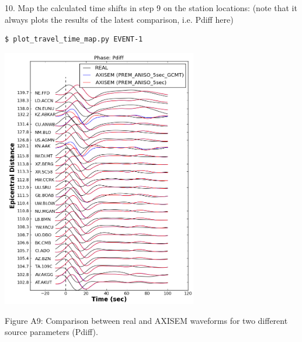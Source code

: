 \documentclass{article}
\begin{document}
\vspace{13pt}
10. Map the calculated time shifts in step 9 on the station locations: (note that 
it always plots the results of the latest comparison, i.e. Pdiff here) 

\begin{verbatim}
$ plot_travel_time_map.py EVENT-1
\end{verbatim}

\begin{center}
\includegraphics[width=242pt, height=322pt, keepaspectratio=true]{AXISEMTutorial-fig015.png}

{\small{}Figure A9: Comparison between real and AXISEM waveforms for two different 
source parameters (Pdiff).}


\end{center}
\end{document}
